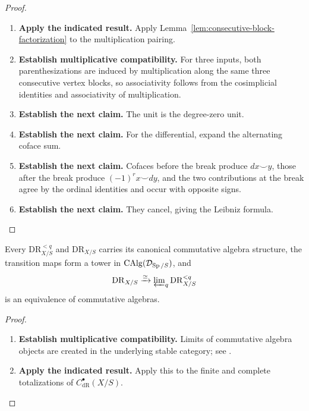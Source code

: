 \begin{proof}
\leavevmode
\begin{enumerate}[label=\textup{(\arabic*)}]
    \item \textbf{Apply the indicated result.}
    Apply Lemma~\ref{lem:consecutive-block-factorization} to the multiplication pairing.
    \item \textbf{Establish multiplicative compatibility.}
    For three inputs, both parenthesizations are induced by multiplication along the same
    three consecutive vertex blocks, so associativity follows from the cosimplicial
    identities and associativity of multiplication.
    \item \textbf{Establish the next claim.}
    The unit is the degree-zero unit.
    \item \textbf{Establish the next claim.}
    For the differential, expand the alternating coface sum.
    \item \textbf{Establish the next claim.}
    Cofaces before the break
    produce \(d x\smile y\), those after the break produce
    \((-1)^rx\smile dy\), and the two contributions at the break agree by the ordinal
    identities and occur with opposite signs.
    \item \textbf{Establish the next claim.}
    They cancel, giving the Leibniz formula.
\end{enumerate}
\end{proof}


\begin{theorem}
\label{thm:einfty-totalizations}
Every \(\mathrm{DR}^{<q}_{X/S}\) and \(\mathrm{DR}_{X/S}\) carries its canonical
commutative algebra structure, the transition maps form a tower in
\(\operatorname{CAlg}(\mathcal D_{\operatorname{Sp}/S})\), and
\[
  \mathrm{DR}_{X/S}
  \xrightarrow{\simeq}
  \varprojlim\nolimits_q\mathrm{DR}^{<q}_{X/S}
\]
is an equivalence of commutative algebras.
\end{theorem}

\begin{proof}
\leavevmode
\begin{enumerate}[label=\textup{(\arabic*)}]
    \item \textbf{Establish multiplicative compatibility.}
    Limits of commutative algebra objects are created in the underlying stable category; see \cite{LurieHigherAlgebra}.
    \item \textbf{Apply the indicated result.}
    Apply this to the finite and complete totalizations of
    \(C^\bullet_{\mathrm{dR}}(X/S)\).
\end{enumerate}
\end{proof}


